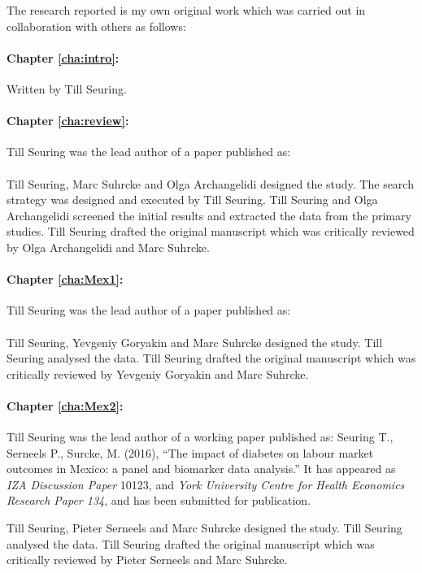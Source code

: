 The research reported is my own original work which was carried out in collaboration with
others as follows:

\paragraph{Chapter \ref{cha:intro}:} Written by Till Seuring. 

\paragraph{Chapter \ref{cha:review}:} Till Seuring was the lead author of a paper published as:
\\[12pt]
\noindent{}
\\[12pt]
\noindent Till Seuring, Marc Suhrcke and Olga Archangelidi designed the study. The search strategy was designed and executed by Till Seuring. Till Seuring and Olga Archangelidi screened the initial results and extracted the data from the primary studies. Till Seuring drafted the original manuscript which was critically reviewed by Olga Archangelidi and Marc Suhrcke.

\paragraph{Chapter \ref{cha:Mex1}:} Till Seuring was the lead author of a paper published as:
\\[12pt]
\noindent{}
\\[12pt]
\noindent Till Seuring, Yevgeniy Goryakin and Marc Suhrcke  designed the study. Till Seuring analysed the data. Till Seuring drafted the original manuscript which was critically reviewed by Yevgeniy Goryakin and Marc Suhrcke.


\paragraph{Chapter \ref{cha:Mex2}:} Till Seuring was the lead author of a working paper published as: 
Seuring T., Serneels P., Surcke, M. (2016), ``The impact of diabetes on labour market outcomes in Mexico: a panel and biomarker data analysis.'' It has appeared as \textit{IZA Discussion Paper} 10123, and \textit{York University Centre for Health Economics Research Paper 134}, and has been submitted for publication.

Till Seuring, Pieter Serneels and Marc Suhrcke designed the study. Till Seuring analysed the data. Till Seuring drafted the original manuscript which was critically reviewed by Pieter Serneels and Marc Suhrcke.



